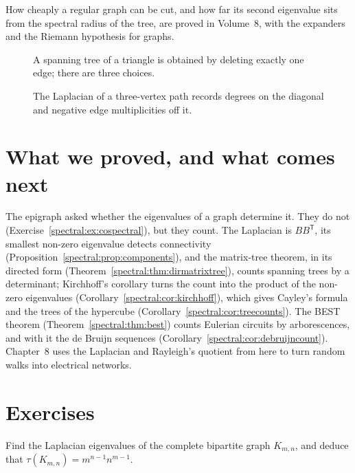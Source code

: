 How cheaply a regular graph can be cut, and how far its second eigenvalue sits from the spectral radius of the tree, are proved in Volume~8, with the expanders and the Riemann hypothesis for graphs.

\begin{figure}[ht]
\centering
{}
\caption{A spanning tree of a triangle is obtained by deleting exactly one edge; there are three choices.}
\label{fig:v12treedeletion}
\end{figure}

\begin{figure}[ht]
\centering
{}
\caption{The Laplacian of a three-vertex path records degrees on the diagonal and negative edge multiplicities off it.}
\label{fig:v12pathlaplacian}
\end{figure}

\section{What we proved, and what comes next}

The epigraph asked whether the eigenvalues of a graph determine it. They do not (Exercise~\ref{spectral:ex:cospectral}), but they count. The Laplacian is $BB^{\mathsf T}$, its smallest non-zero eigenvalue detects connectivity (Proposition~\ref{spectral:prop:components}), and the matrix-tree theorem, in its directed form (Theorem~\ref{spectral:thm:dirmatrixtree}), counts spanning trees by a determinant; Kirchhoff's corollary turns the count into the product of the non-zero eigenvalues (Corollary~\ref{spectral:cor:kirchhoff}), which gives Cayley's formula and the trees of the hypercube (Corollary~\ref{spectral:cor:treecounts}). The BEST theorem (Theorem~\ref{spectral:thm:best}) counts Eulerian circuits by arborescences, and with it the de Bruijn sequences (Corollary~\ref{spectral:cor:debruijncount}). Chapter~8 uses the Laplacian and Rayleigh's quotient from here to turn random walks into electrical networks.

\section{Exercises}

\begin{exercise}[$\star$]\label{spectral:ex:kmntrees}
Find the Laplacian eigenvalues of the complete bipartite graph $K_{m,n}$, and deduce that $\tau(K_{m,n})=m^{n-1}n^{m-1}$.
\end{exercise}

